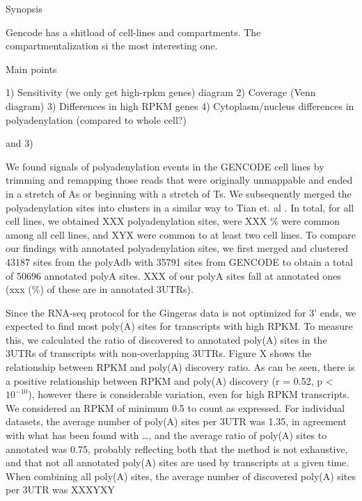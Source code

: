 \documentclass[a4paper]{article}
\begin{document}
 
Synopsis

Gencode has a shitload of cell-lines and compartments. The compartmentalization
si the most interesting one.

Main points

1) Sensitivity (we only get high-rpkm genes) diagram
2) Coverage (Venn diagram)
3) Differences in high RPKM genes
4) Cytoplasm/nucleus differences in polyadenylation (compared to whole cell?)

and 3) %

We found signals of polyadenylation events in the GENCODE cell lines by
trimming and remapping those reads that were originally unmappable and ended in
a stretch of As or beginning with a stretch of Ts. We subsequently merged the
polyadenylation sites into clusters in a similar way to Tian et. al
\cite{tian_large-scale_2005}. In total, for all cell lines, we obtained XXX
polyadenylation sites, were XXX \% were common among all cell lines, and XYX
were common to at least two cell lines. To compare our findings with annotated
polyadenylation sites, we first merged and clustered 43187 sites from the
polyAdb with 35791 sites from GENCODE to obtain a total of 50696 annotated
polyA sites. XXX of our polyA sites fall at annotated ones (xxx (\%) of these
are in annotated 3UTRs).

Since the RNA-seq protocol for the Gingeras data is not optimized for 3' ends,
we expected to find most poly(A) sites for transcripts with high RPKM. To
measure this, we calculated the ratio of discovered to annotated poly(A) sites
in the 3UTRs of transcripts with non-overlapping 3UTRs. Figure X shows the
relationship between RPKM and poly(A) discovery ratio. As can be seen, there is
a positive relationship between RPKM and poly(A) discovery (r = 0.52, p <
$10^{-10}$), however there is considerable variation, even for high RPKM
transcripts. We considered an RPKM of minimum 0.5 to count as expressed. For
individual datasets, the average number of poly(A) sites per 3UTR was 1.35, in
agreement with what has been found with \dots , and the average ratio of
poly(A) sites to annotated was 0.75, probably reflecting both that the method
is not exhaustive, and that not all annotated poly(A) sites are used by
transcripts at a given time. When combining all poly(A) sites, the average
number of discovered poly(A) sites per 3UTR was XXXYXY
\end{document}
